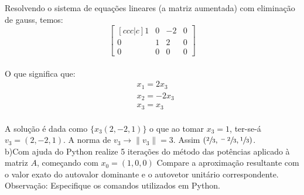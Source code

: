 Resolvendo o sistema de equações lineares (a matriz aumentada) com eliminação de gauss, temos:\\

\[
    \begin{bmatrix}[ccc|c]
        1 & 0 & -2 & 0 \\
        0 & 1 & 2  & 0 \\
        0 & 0 & 0  & 0
    \end{bmatrix}
\]\\

O que significa que:\\

\[
    \begin{split}
        &x_1 = 2x_3\\
        &x_2 = -2x_3\\
        &x_3 = x_3
    \end{split}
\]
\\

A solução é dada como $\{x_3(2,-2, 1)\}$ o que ao tomar $x_3=1$, ter-se-á $v_3=(2,-2, 1)$. A norma de $v_3\to \|v_3\|=3$. Assim $(\sfrac{2}{3}, \sfrac{-2}{3}, \sfrac{1}{3})$.\\


b)Com ajuda do Python realize 5 iterações do método das potências aplicado à matriz $A$, começando com $x_0=(1,0,0)$ Compare a aproximação resultante com o valor exato do autovalor dominante e o autovetor unitário correspondente. Observação: Especifique os comandos utilizados em Python.


